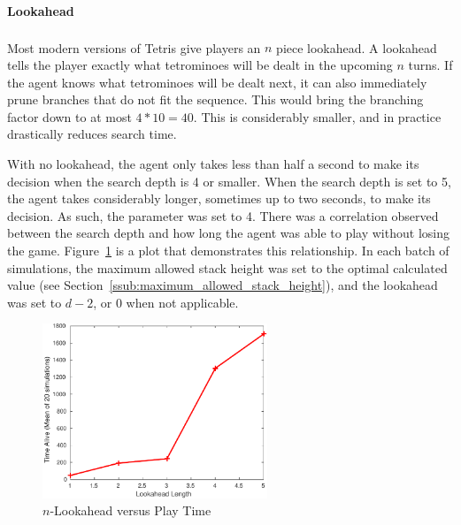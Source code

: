 \documentclass[fontsize=12pt]{article}
\def\tetris{Tetris\textsuperscript{\textregistered}}
\begin{document}
\paragraph{Lookahead}
\label{par:lookahead}
Most modern versions of \tetris{} give players an $n$ piece lookahead. A lookahead tells the player exactly what tetrominoes will be dealt in the upcoming $n$ turns. If the agent knows what tetrominoes will be dealt next, it can also immediately prune branches that do not fit the sequence. This would bring the branching factor down to at most $4 * 10 = 40$. This is considerably smaller, and in practice drastically reduces search time.

\par With no lookahead, the agent only takes less than half a second to make its decision when the search depth is 4 or smaller. When the search depth is set to 5, the agent takes considerably longer, sometimes up to two seconds, to make its decision. As such, the parameter was set to 4. There was a correlation observed between the search depth and how long the agent was able to play without losing the game. Figure~\ref{fig:n_lookahead_vs_play_time} is a plot that demonstrates this relationship. In each batch of simulations, the maximum allowed stack height was set to the optimal calculated value (see Section~\ref{ssub:maximum_allowed_stack_height}), and the lookahead was set to $d-2$, or 0 when not applicable.

\begin{figure}[h!]
  \centering
  \includegraphics[width=0.6\textwidth]{figures/lookahead_v_time}
  \caption{$n$-Lookahead versus Play Time}
  \label{fig:n_lookahead_vs_play_time}
\end{figure}
\end{document}
